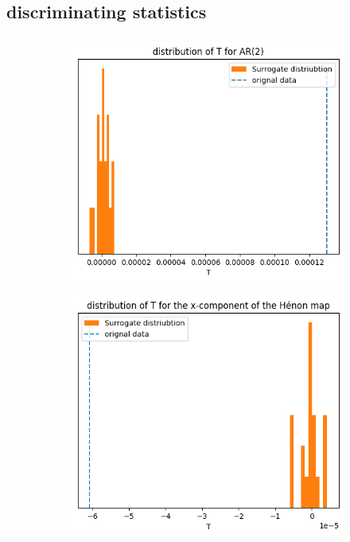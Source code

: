 \subsection{discriminating statistics}
\begin{frame}
  \frametitle{\insertsectionhead}
  \framesubtitle{\insertsubsectionhead}
\begin{figure}
  \centering
  \begin{subfigure}[b]{0.4\textwidth}
    \includegraphics[width=\textwidth]{figs/IID_ar2_T.png}
  \end{subfigure}
  \begin{subfigure}[b]{0.4\textwidth}
    \includegraphics[width=\textwidth]{figs/IID_henon_T.png}
  \end{subfigure}
\end{figure}
\end{frame}

